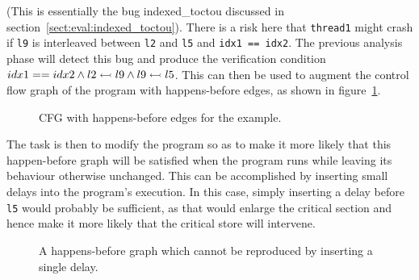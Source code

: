 (This is essentially the bug indexed\_toctou discussed in
section~\ref{sect:eval:indexed_toctou}).  There is a risk here that
\verb|thread1| might crash if \verb|l9| is interleaved between
\verb|l2| and \verb|l5| and \verb|idx1 == idx2|.  The previous
analysis phase will detect this bug and produce the verification
condition $idx1 == idx2 \wedge l2 \leftarrowtail l9 \wedge l9
\leftarrowtail l5$.  This can then be used to augment the
control flow graph of the program with happens-before edges, as
shown in figure~\ref{fig:using:example_hb_graph}.

\begin{figure}
  \caption{CFG with happens-before edges for the example.}
  \label{fig:using:example_hb_graph}
\end{figure}

The task is then to modify the program so as to make it more likely
that this happen-before graph will be satisfied when the program runs
while leaving its behaviour otherwise unchanged.  This can be
accomplished by inserting small delays into the program's execution.
In this case, simply inserting a delay before \verb|l5| would probably
be sufficient, as that would enlarge the critical section and hence
make it more likely that the critical store will intervene.

\begin{figure}
  \caption{A happens-before graph which cannot be reproduced by
    inserting a single delay.}
  \label{fig:enforce_crash:complex_hb}
\end{figure}

